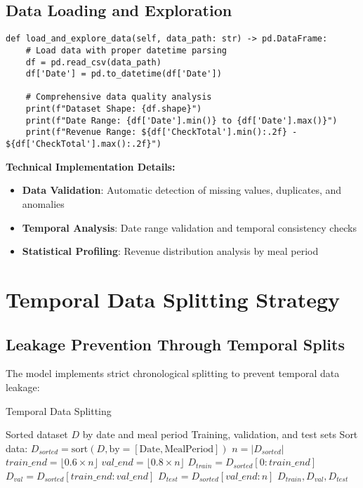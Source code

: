 \documentclass[12pt,a4paper]{article}
\begin{document}
\subsection{Data Loading and Exploration}

\begin{lstlisting}[caption=Data Loading Method]
def load_and_explore_data(self, data_path: str) -> pd.DataFrame:
    # Load data with proper datetime parsing
    df = pd.read_csv(data_path)
    df['Date'] = pd.to_datetime(df['Date'])
    
    # Comprehensive data quality analysis
    print(f"Dataset Shape: {df.shape}")
    print(f"Date Range: {df['Date'].min()} to {df['Date'].max()}")
    print(f"Revenue Range: ${df['CheckTotal'].min():.2f} - ${df['CheckTotal'].max():.2f}")
\end{lstlisting}

\textbf{Technical Implementation Details:}
\begin{itemize}
    \item \textbf{Data Validation}: Automatic detection of missing values, duplicates, and anomalies
    \item \textbf{Temporal Analysis}: Date range validation and temporal consistency checks
    \item \textbf{Statistical Profiling}: Revenue distribution analysis by meal period
\end{itemize}

\section{Temporal Data Splitting Strategy}

\subsection{Leakage Prevention Through Temporal Splits}

The model implements strict chronological splitting to prevent temporal data leakage:

\begin{algorithm}
\caption{Temporal Data Splitting}
\begin{algorithmic}[1]
\REQUIRE Sorted dataset $D$ by date and meal period
\ENSURE Training, validation, and test sets
\STATE Sort data: $D_{sorted} = \text{sort}(D, \text{by}=[\text{Date}, \text{MealPeriod}])$
\STATE $n = |D_{sorted}|$
\STATE $train\_end = \lfloor 0.6 \times n \rfloor$
\STATE $val\_end = \lfloor 0.8 \times n \rfloor$
\STATE $D_{train} = D_{sorted}[0:train\_end]$
\STATE $D_{val} = D_{sorted}[train\_end:val\_end]$
\STATE $D_{test} = D_{sorted}[val\_end:n]$
\RETURN $D_{train}, D_{val}, D_{test}$
\end{algorithmic}
\end{algorithm}
\end{document}
